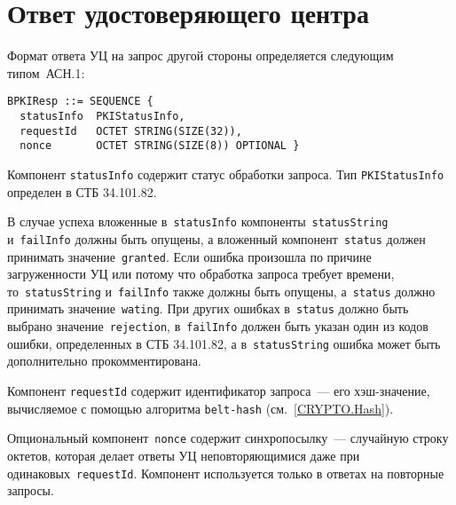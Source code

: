 \section{Ответ удостоверяющего центра}\label{FMT.BPKIResp}

Формат ответа УЦ на запрос другой стороны определяется следующим типом~АСН.1:
\begin{verbatim}
BPKIResp ::= SEQUENCE { 
  statusInfo  PKIStatusInfo,
  requestId   OCTET STRING(SIZE(32)),
  nonce       OCTET STRING(SIZE(8)) OPTIONAL }
\end{verbatim}

Компонент \texttt{statusInfo} содержит статус обработки запроса.
Тип \texttt{PKIStatusInfo} определен в СТБ 34.101.82. 

В случае успеха вложенные в~\texttt{statusInfo} 
компоненты~\texttt{statusString} 
и~\texttt{failInfo} должны быть опущены, а вложенный
компонент~\texttt{status} должен принимать значение~\texttt{granted}.
%
Если ошибка произошла по причине загруженности УЦ или потому
что обработка запроса требует времени, 
то~\texttt{statusString} и~\texttt{failInfo} также должны быть опущены, 
а~\texttt{status} должно принимать значение~\texttt{wating}.
%
При других ошибках в~\texttt{status} должно быть выбрано 
значение~\texttt{rejection}, в~\texttt{failInfo} должен быть указан один 
из кодов ошибки, определенных в СТБ 34.101.82, а в~\texttt{statusString} 
ошибка может быть дополнительно прокомментирована.

Компонент \texttt{requestId} содержит идентификатор запроса~--- 
его хэш-значение, вычисляемое с помощью алгоритма \texttt{belt-hash} 
(см.~\ref{CRYPTO.Hash}). 

Опциональный компонент~\texttt{nonce} содержит синхропосылку~---
случайную строку октетов, которая делает ответы УЦ неповторяющимися даже 
при одинаковых~\texttt{requestId}. Компонент используется только в ответах
на повторные запросы.
